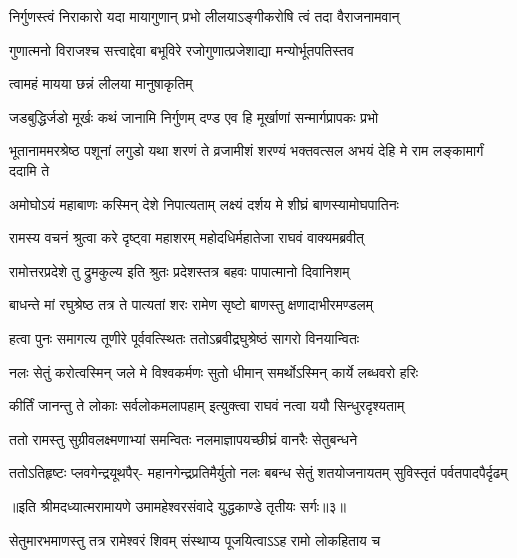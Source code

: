 \twolineshloka
{निर्गुणस्त्वं निराकारो यदा मायागुणान् प्रभो}
{लीलयाऽङ्गीकरोषि त्वं तदा वैराजनामवान्} %

\twolineshloka
{गुणात्मनो विराजश्च सत्त्वाद्देवा बभूविरे}
{रजोगुणात्प्रजेशाद्या मन्योर्भूतपतिस्तव} %

{त्वामहं मायया छन्नं लीलया मानुषाकृतिम्} %


\twolineshloka
{जडबुद्धिर्जडो मूर्खः कथं जानामि निर्गुणम्}
{दण्ड एव हि मूर्खाणां सन्मार्गप्रापकः प्रभो} %

\threelineshloka
{भूतानाममरश्रेष्ठ पशूनां लगुडो यथा}
{शरणं ते व्रजामीशं शरण्यं भक्तवत्सल}
{अभयं देहि मे राम लङ्कामार्गं ददामि ते} %


\twolineshloka
{अमोघोऽयं महाबाणः कस्मिन् देशे निपात्यताम्}
{लक्ष्यं दर्शय मे शीघ्रं बाणस्यामोघपातिनः} %

\twolineshloka
{रामस्य वचनं श्रुत्वा करे दृष्ट्वा महाशरम्}
{महोदधिर्महातेजा राघवं वाक्यमब्रवीत्} %

\twolineshloka
{रामोत्तरप्रदेशे तु द्रुमकुल्य इति श्रुतः}
{प्रदेशस्तत्र बहवः पापात्मानो दिवानिशम्} %

\twolineshloka
{बाधन्ते मां रघुश्रेष्ठ तत्र ते पात्यतां शरः}
{रामेण सृष्टो बाणस्तु क्षणादाभीरमण्डलम्} %

\twolineshloka
{हत्वा पुनः समागत्य तूणीरे पूर्ववत्स्थितः}
{ततोऽब्रवीद्रघुश्रेष्ठं सागरो विनयान्वितः} %

\twolineshloka
{नलः सेतुं करोत्वस्मिन् जले मे विश्वकर्मणः}
{सुतो धीमान् समर्थोऽस्मिन् कार्ये लब्धवरो हरिः} %

\twolineshloka
{कीर्तिं जानन्तु ते लोकाः सर्वलोकमलापहाम्}
{इत्युक्त्वा राघवं नत्वा ययौ सिन्धुरदृश्यताम्} %

\twolineshloka
{ततो रामस्तु सुग्रीवलक्ष्मणाभ्यां समन्वितः}
{नलमाज्ञापयच्छीघ्रं वानरैः सेतुबन्धने} %

\fourlineindentedshloka
{ततोऽतिहृष्टः प्लवगेन्द्रयूथपैर्-}
{महानगेन्द्रप्रतिमैर्युतो नलः}
{बबन्ध सेतुं शतयोजनायतम्}
{सुविस्तृतं पर्वतपादपैर्दृढम्} %

{॥इति श्रीमदध्यात्मरामायणे उमामहेश्वरसंवादे युद्धकाण्डे
तृतीयः सर्गः॥३॥
}





\twolineshloka
{सेतुमारभमाणस्तु तत्र रामेश्वरं शिवम्}
{संस्थाप्य पूजयित्वाऽऽह रामो लोकहिताय च} %

